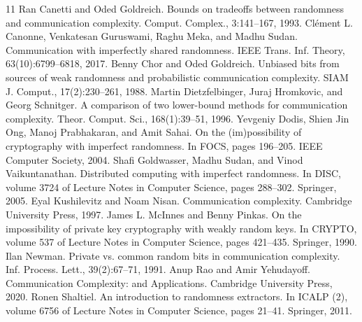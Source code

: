 \begin{thebibliography}{11}
 Ran Canetti and Oded Goldreich. Bounds on tradeoffs between randomness and communication complexity. Comput. Complex., 3:141--167, 1993.
 Clément L. Canonne, Venkatesan Guruswami, Raghu Meka, and Madhu Sudan. Communication with imperfectly shared randomness. IEEE Trans. Inf. Theory, 63(10):6799--6818, 2017.
 Benny Chor and Oded Goldreich. Unbiased bits from sources of weak randomness and probabilistic communication complexity. SIAM J. Comput., 17(2):230--261, 1988.
 Martin Dietzfelbinger, Juraj Hromkovic, and Georg Schnitger. A comparison of two lower-bound methods for communication complexity. Theor. Comput. Sci., 168(1):39--51, 1996.
 Yevgeniy Dodis, Shien Jin Ong, Manoj Prabhakaran, and Amit Sahai. On the (im)possibility of cryptography with imperfect randomness. In FOCS, pages 196--205. IEEE Computer Society, 2004.
 Shafi Goldwasser, Madhu Sudan, and Vinod Vaikuntanathan. Distributed computing with imperfect randomness. In DISC, volume 3724 of Lecture Notes in Computer Science, pages 288--302. Springer, 2005.
 Eyal Kushilevitz and Noam Nisan. Communication complexity. Cambridge University Press, 1997.
 James L. McInnes and Benny Pinkas. On the impossibility of private key cryptography with weakly random keys. In CRYPTO, volume 537 of Lecture Notes in Computer Science, pages 421--435. Springer, 1990.
 Ilan Newman. Private vs. common random bits in communication complexity. Inf. Process. Lett., 39(2):67--71, 1991.
 Anup Rao and Amir Yehudayoff. Communication Complexity: and Applications. Cambridge University Press, 2020.
 Ronen Shaltiel. An introduction to randomness extractors. In ICALP (2), volume 6756 of Lecture Notes in Computer Science, pages 21--41. Springer, 2011.
\end{thebibliography}
